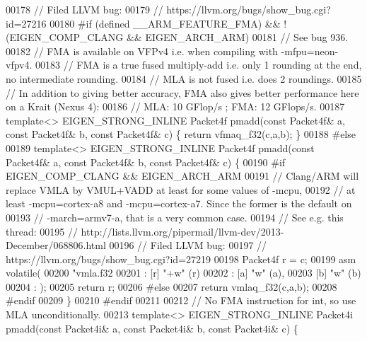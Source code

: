 \begin{DoxyCode}
{00178 \textcolor{comment}{// Filed LLVM bug:}
00179 \textcolor{comment}{//     https://llvm.org/bugs/show\_bug.cgi?id=27216}
00180 \textcolor{preprocessor}{#if (defined \_\_ARM\_FEATURE\_FMA) && !(EIGEN\_COMP\_CLANG && EIGEN\_ARCH\_ARM)}
00181 \textcolor{comment}{// See bug 936.}
00182 \textcolor{comment}{// FMA is available on VFPv4 i.e. when compiling with -mfpu=neon-vfpv4.}
00183 \textcolor{comment}{// FMA is a true fused multiply-add i.e. only 1 rounding at the end, no intermediate rounding.}
00184 \textcolor{comment}{// MLA is not fused i.e. does 2 roundings.}
00185 \textcolor{comment}{// In addition to giving better accuracy, FMA also gives better performance here on a Krait (Nexus 4):}
00186 \textcolor{comment}{// MLA: 10 GFlop/s ; FMA: 12 GFlops/s.}
00187 \textcolor{keyword}{template}<> EIGEN\_STRONG\_INLINE Packet4f pmadd(\textcolor{keyword}{const} Packet4f& a, \textcolor{keyword}{const} Packet4f& b, \textcolor{keyword}{const} Packet4f& c) \{ \textcolor{keywordflow}{
      return} vfmaq\_f32(c,a,b); \}
00188 \textcolor{preprocessor}{#else}
00189 \textcolor{keyword}{template}<> EIGEN\_STRONG\_INLINE Packet4f pmadd(\textcolor{keyword}{const} Packet4f& a, \textcolor{keyword}{const} Packet4f& b, \textcolor{keyword}{const} Packet4f& c) \{
00190 \textcolor{preprocessor}{#if EIGEN\_COMP\_CLANG && EIGEN\_ARCH\_ARM}
00191   \textcolor{comment}{// Clang/ARM will replace VMLA by VMUL+VADD at least for some values of -mcpu,}
00192   \textcolor{comment}{// at least -mcpu=cortex-a8 and -mcpu=cortex-a7. Since the former is the default on}
00193   \textcolor{comment}{// -march=armv7-a, that is a very common case.}
00194   \textcolor{comment}{// See e.g. this thread:}
00195   \textcolor{comment}{//     http://lists.llvm.org/pipermail/llvm-dev/2013-December/068806.html}
00196   \textcolor{comment}{// Filed LLVM bug:}
00197   \textcolor{comment}{//     https://llvm.org/bugs/show\_bug.cgi?id=27219}
00198   Packet4f r = c;
00199   \textcolor{keyword}{asm} \textcolor{keyword}{volatile}(
00200     \textcolor{stringliteral}{"vmla.f32 %
00201     : [r] \textcolor{stringliteral}{"+w"} (r)
00202     : [a] \textcolor{stringliteral}{"w"} (a),
00203       [b] \textcolor{stringliteral}{"w"} (b)
00204     : );
00205   \textcolor{keywordflow}{return} r;
00206 \textcolor{preprocessor}{#else}
00207   \textcolor{keywordflow}{return} vmlaq\_f32(c,a,b);
00208 \textcolor{preprocessor}{#endif}
00209 \}
00210 \textcolor{preprocessor}{#endif}
00211 
00212 \textcolor{comment}{// No FMA instruction for int, so use MLA unconditionally.}
00213 \textcolor{keyword}{template}<> EIGEN\_STRONG\_INLINE Packet4i pmadd(\textcolor{keyword}{const} Packet4i& a, \textcolor{keyword}{const} Packet4i& b, \textcolor{keyword}{const} Packet4i& c) \{ \textcolor{keywordflow}{
}}}
\end{DoxyCode}
